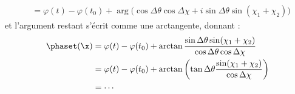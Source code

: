 \begin{annexe}
\begin{demo}
\begin{align*}
		&= \varphi(t) - \varphi(t_0) + \arg\Big( \cos\Delta\theta \cos\Delta\chi + i\sin\Delta\theta \sin(\chi_1+\chi_2) \Big)
	\end{align*}
	et l'argument restant s'écrit comme une arctangente, donnant :
	\begin{align*}
		\phaset(\x) &= \varphi(t)-\varphi(t_0) + \arctan\frac{\sin\Delta\theta \sin(\chi_1+\chi_2)}{\cos\Delta\theta \cos\Delta\chi} \\
		&= \varphi(t)-\varphi(t_0) + \arctan \left( \tan\Delta\theta\frac{\sin(\chi_1+\chi_2)}{\cos\Delta\chi} \right) \\
		&= \cdots
	\end{align*}
\end{demo}

\end{annexe}